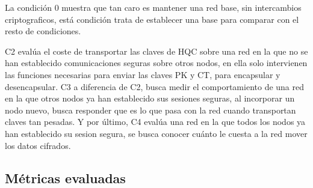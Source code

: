 La condición 0 muestra que tan caro es mantener una red base, sin intercambios criptograficos, está condición 
trata de establecer una base para comparar con el resto de condiciones. 

C2 evalúa el coste de transportar las claves de HQC sobre una red en la que no se han establecido comunicaciones seguras sobre otros nodos, en ella solo intervienen
las funciones necesarias para enviar las claves PK y CT, para encapsular y desencapsular. C3 a diferencia de C2, busca 
medir el comportamiento de una red en la que otros nodos ya han establecido sus sesiones seguras, al incorporar un nodo nuevo, busca responder 
que es lo que pasa con la red cuando transportan claves tan pesadas. Y por último, C4 evalúa una red en la que todos los nodos ya han establecido su sesion segura, se busca conocer cuánto le cuesta a la red
mover los datos cifrados. 



  \subsection{Métricas evaluadas}
